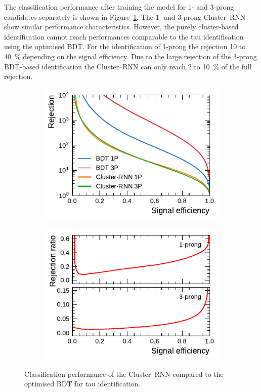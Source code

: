 The classification performance after training the model for 1- and 3-prong
\tauhadvis candidates separately is shown in
Figure~\ref{fig:cluster_rnn_roc_ratios}. The 1- and 3-prong Cluster--RNN show
similar performance characteristics. However, the purely cluster-based
identification cannot reach performances comparable to the tau identification
using the optimised BDT. For the identification of 1-prong \tauhadvis the
rejection \num{10} to \SI{40}{\percent} depending on the signal efficiency. Due
to the large rejection of the 3-prong BDT-based identification the Cluster--RNN
can only reach \num{2} to \SI{10}{\percent} of the full rejection.

\begin{figure}[htb]
  \begin{subfigure}[t]{0.48\textwidth}
    \centering
    \includegraphics{./figures/rnn/cluster/roc.pdf}
  \end{subfigure}\hfill
  \begin{subfigure}[t]{0.48\textwidth}
    \centering
    \includegraphics{./figures/rnn/cluster/ratios.pdf}
  \end{subfigure}
  \caption{Classification performance of the Cluster--RNN compared to the
    optimised BDT for tau identification.}
  \label{fig:cluster_rnn_roc_ratios}
\end{figure}

